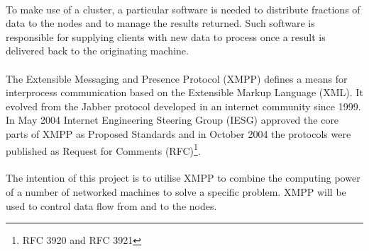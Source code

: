 \paragraph{}
To make use of a cluster, a particular software is needed to distribute fractions of data to the nodes and to manage the results returned. Such software is responsible for supplying clients with new data to process once a result is delivered back to the originating machine.
\paragraph{}
The Extensible Messaging and Presence Protocol (XMPP) defines a means for interprocess communication based on the Extensible Markup Language (XML). It evolved from the Jabber protocol developed in an internet community since 1999. In May 2004 Internet Engineering Steering Group (IESG) approved the core parts of XMPP \cite{xmpp-core,xmpp-im} as Proposed Standards and in October 2004 the protocols were published as Request for Comments (RFC)\footnote{RFC 3920 and RFC 3921}.
\paragraph{}
The intention of this project is to utilise XMPP to combine the computing power of a number of networked machines to solve a specific problem. XMPP will be used to control data flow from and to the nodes.

